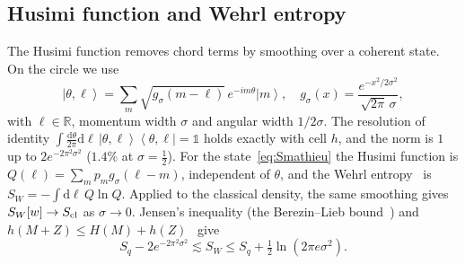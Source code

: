 \documentclass[pra,twocolumn,superscriptaddress,longbibliography,floatfix]{revtex4-2}
\newcommand{\ket}[1]{\left|#1\right\rangle}
\newcommand{\ketbra}[2]{\left|#1\right\rangle\!\left\langle#2\right|}
\newcommand{\dd}{\mathrm{d}}
\newcommand{\Scl}{S_{\rm cl}}
\newcommand{\SW}{S_{W}}
\begin{document}
\subsection{Husimi function and Wehrl entropy}

The Husimi function removes chord terms by smoothing over a coherent state. On
the circle we use~\cite{KRP,GonzalezOlmo}
\begin{equation}
\ket{\theta,\ell}=\sum_{m}\sqrt{g_{\sigma}(m-\ell)}\,e^{-im\theta}\ket m,\quad
g_{\sigma}(x)=\frac{e^{-x^{2}/2\sigma^{2}}}{\sqrt{2\pi}\,\sigma},
\label{eq:cs}
\end{equation}
with $\ell\in\mathbb{R}$, momentum width $\sigma$ and angular width $1/2\sigma$.
The resolution of identity
$\int\frac{\dd\theta}{2\pi}\dd\ell\,\ketbra{\theta,\ell}{\theta,\ell}=\mathbb{1}$
holds exactly with cell $h$, and the norm is $1$ up to
$2e^{-2\pi^{2}\sigma^{2}}$ ($1.4\%$ at $\sigma=\tfrac12$). For the
state~\eqref{eq:Smathieu} the Husimi function is
$Q(\ell)=\sum_{m}p_{m}g_{\sigma}(\ell-m)$, independent of $\theta$, and the Wehrl
entropy~\cite{Wehrl,Wehrl79} is $\SW=-\int\dd\ell\,Q\ln Q$. Applied to the
classical density, the same smoothing gives $\SW[w]\to\Scl$ as $\sigma\to0$.
Jensen's inequality (the Berezin--Lieb bound~\cite{Berezin,Lieb}) and
$h(M+Z)\le H(M)+h(Z)$~\cite{CoverThomas} give
\begin{equation}
S_{q}-2e^{-2\pi^{2}\sigma^{2}}\lesssim\SW\le S_{q}+\tfrac12\ln(2\pi e\sigma^{2}).
\label{eq:bounds}
\end{equation}
\end{document}
